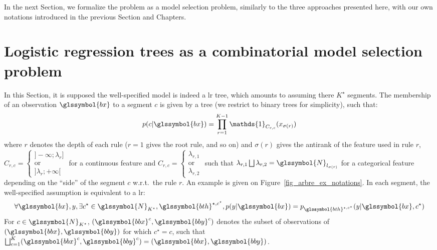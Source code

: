 In the next Section, we formalize the problem as a model selection problem, similarly to the three approaches presented here, with our own notations introduced in the previous Section and Chapters.


\section{Logistic regression trees as a combinatorial model selection problem} \label{sec:model_selec_tree}

In this Section, it is supposed the well-specified model is indeed a \gls{lr} tree, which amounts to assuming there $K^\star$ segments. The membership of an observation $\glssymbol{bx}$ to a segment $c$ is given by a tree (we restrict to binary trees for simplicity), such that:
\begin{equation} \label{eq:tree}
p( c | \glssymbol{bx}) = \prod_{r = 1}^{K-1} \mathds{1}_{C_{r,c}} (x_{\sigma(r)})
\end{equation}
where $r$ denotes the depth of each rule ($r=1$ gives the root rule, and so on) and $\sigma(r)$ gives the antirank of the feature used in rule $r$, $C_{r,c} = \begin{cases} ]-\infty ; \lambda_r] \\ \text{or} \\ ] \lambda_r ; +\infty[ \end{cases}$ for a continuous feature and $C_{r,c} = \begin{cases} \lambda_{r,1} \\ \text{or} \\ \lambda_{r,2} \end{cases}$ such that $ \lambda_{r,1} \bigsqcup \lambda_{r,2} = \glssymbol{N}_{l_{\sigma(r)}}$ for a categorical feature depending on the ``side'' of the segment $c$ w.r.t.\ the rule $r$. An example is given on Figure~\ref{fig_arbre_ex_notations}.
In each segment, the well-specified assumption is equivalent to a \gls{lr}:
\begin{equation} \label{eq:lr_tree}
\forall \glssymbol{bx}, y, \exists c^\star \in \glssymbol{N}_{K^\star}, \glssymbol{bth}^{\star,c^\star}, p(y | \glssymbol{bx}) = p_{\glssymbol{bth}^{\star,c^\star}}(y | \glssymbol{bx}, c^\star)
\end{equation}
For $c \in \glssymbol{N}_{K^\star}$, $(\glssymbol{bbx}^c, \glssymbol{bby}^c)$ denotes the subset of observations of $(\glssymbol{bbx}, \glssymbol{bby})$ for which $c^\star = c$, such that $ \bigsqcup_{c=1}^{K} (\glssymbol{bbx}^c, \glssymbol{bby}^c) = (\glssymbol{bbx}, \glssymbol{bby})$.

